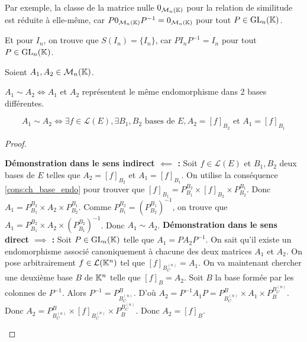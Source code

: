 \documentclass[12pt, a4paper]{report}
\begin{document}
Par exemple, la classe de la matrice nulle $0_{\mathcal M_n(\mathbb{K})}$ pour la relation de similitude est réduite à elle-même, car $P 0_{\mathcal M_n(\mathbb{K})} P^{-1} = 0_{\mathcal M_n(\mathbb{K})}$ pour tout $P \in \mathrm{GL}_n(\mathbb{K})$.

Et pour $I_n$, on trouve que $S(I_n) = \{I_n\}$, car $P I_n P^{-1} = I_n$ pour tout $P \in \mathrm{GL}_n(\mathbb{K})$.

\begin{property}
    Soient $A_1,A_2 \in \mathcal M_n(\mathbb{K})$.

    $A_1 \sim A_2 \iff A_1$ et $A_2$ représentent le même endomorphisme dans 2 bases différentes.

    $$A_1 \sim A_2 \iff \exists f \in \mathcal L(E), \exists B_1,B_2 \text{ bases de } E, A_2 = [f]_{B_2} \text{ et } A_1 = [f]_{B_1}$$
\end{property}

\begin{proof}
    \begin{outline}
        \1 \textbf{Démonstration dans le sens indirect $\impliedby$ :}
        \2 Soit $f \in \mathcal L(E)$ et $B_1,B_2$ deux bases de $E$ telles que $A_2 = [f]_{B_2}$ et $A_1 = [f]_{B_1}$.
        \2 On utilise la conséquence \ref{cons:ch_base_endo} pour trouver que $[f]_{B_1} = P_{B_1}^{B_2} \times [f]_{B_2} \times P_{B_2}^{B_1}$.
        \2 Donc $A_1 = P_{B_1}^{B_2} \times A_2 \times P_{B_2}^{B_1}$.
        \2 Comme $P_{B_1}^{B_2} = (P_{B_2}^{B_1})^{-1}$, on trouve que $A_1 = P_{B_1}^{B_2} \times A_2 \times (P_{B_1}^{B_2})^{-1}$.
        \2 Donc $A_1 \sim A_2$.
        \1 \textbf{Démonstration dans le sens direct $\implies$ :}
        \2 Soit $P \in \mathrm{GL}_n(\mathbb{K})$ telle que $A_1 = P A_2 P^{-1}$.
        \2 On sait qu'il existe un endomorphisme associé canoniquement à chacune des deux matrices $A_1$ et $A_2$.
        \2 On pose arbitrairement $f \in \mathcal L(\mathbb{K}^n)$ tel que $[f]_{B_C^{(n)}} = A_1$.
        \2 On va maintenant chercher une deuxième base $B$ de $\mathbb{K}^n$ telle que $[f]_B = A_2$.
        \2 Soit $B$ la base formée par les colonnes de $P^{-1}$.
        \2 Alors $P^{-1} = P_{B_C^{(n)}}^B$.
        \2 D'où $A_2 = P^{-1} A_1 P = P_{B_C^{(n)}}^B \times A_1 \times P_{B}^{B_C^{(n)}}$.
        \2 Donc $A_2 = P_{B_C^{(n)}}^B \times [f]_{B_C^{(n)}} \times P_{B}^{B_C^{(n)}}$.
        \2 Donc $A_2 = [f]_B$.
    \end{outline}
\end{proof}
\end{document}
